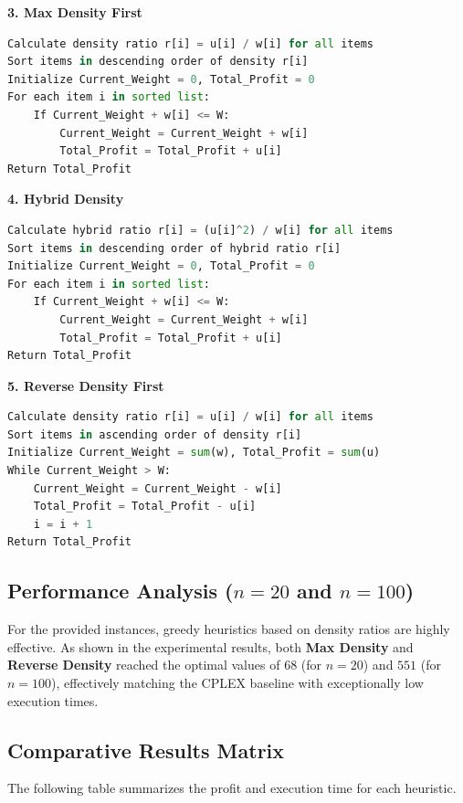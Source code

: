 \documentclass[11pt,a4paper]{article}
\begin{document}
\textbf{3. Max Density First}
\begin{lstlisting}[language=Python, numbers=none, frame=none]
Calculate density ratio r[i] = u[i] / w[i] for all items
Sort items in descending order of density r[i]
Initialize Current_Weight = 0, Total_Profit = 0
For each item i in sorted list:
    If Current_Weight + w[i] <= W:
        Current_Weight = Current_Weight + w[i]
        Total_Profit = Total_Profit + u[i]
Return Total_Profit
\end{lstlisting}

\textbf{4. Hybrid Density}
\begin{lstlisting}[language=Python, numbers=none, frame=none]
Calculate hybrid ratio r[i] = (u[i]^2) / w[i] for all items
Sort items in descending order of hybrid ratio r[i]
Initialize Current_Weight = 0, Total_Profit = 0
For each item i in sorted list:
    If Current_Weight + w[i] <= W:
        Current_Weight = Current_Weight + w[i]
        Total_Profit = Total_Profit + u[i]
Return Total_Profit
\end{lstlisting}

\textbf{5. Reverse Density First}
\begin{lstlisting}[language=Python, numbers=none, frame=none]
Calculate density ratio r[i] = u[i] / w[i] for all items
Sort items in ascending order of density r[i]
Initialize Current_Weight = sum(w), Total_Profit = sum(u)
While Current_Weight > W:
    Current_Weight = Current_Weight - w[i]
    Total_Profit = Total_Profit - u[i]
    i = i + 1
Return Total_Profit
\end{lstlisting}

\subsection{Performance Analysis ($n=20$ and $n=100$)}
For the provided instances, greedy heuristics based on density ratios are highly effective. As shown in the experimental results, both \textbf{Max Density} and \textbf{Reverse Density} reached the optimal values of $68$ (for $n=20$) and $551$ (for $n=100$), effectively matching the CPLEX baseline with exceptionally low execution times.

\subsection{Comparative Results Matrix}
The following table summarizes the profit and execution time for each heuristic.
\end{document}

